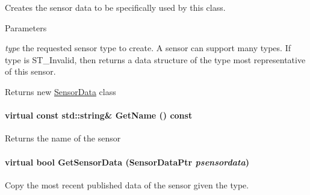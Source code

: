 Creates the sensor data to be specifically used by this class. 


\begin{DoxyParams}{Parameters}
\item[{\em type}]the requested sensor type to create. A sensor can support many types. If type is ST\_\-Invalid, then returns a data structure of the type most representative of this sensor. \end{DoxyParams}
\begin{DoxyReturn}{Returns}
new \hyperlink{classOpenRAVE_1_1SensorBase_1_1SensorData}{SensorData} class 
\end{DoxyReturn}
\hypertarget{classOpenRAVE_1_1SensorBase_a3cc720dbc55fa8e07a0f85343d3bb136}{
\paragraph[{GetName}]{\setlength{\rightskip}{0pt plus 5cm}virtual const std::string\& GetName () const}\hfill}
\label{classOpenRAVE_1_1SensorBase_a3cc720dbc55fa8e07a0f85343d3bb136}
\begin{DoxyReturn}{Returns}
the name of the sensor 
\end{DoxyReturn}
\hypertarget{classOpenRAVE_1_1SensorBase_ad7b2e5f8884dd4897de003828e8e8146}{
\paragraph[{GetSensorData}]{\setlength{\rightskip}{0pt plus 5cm}virtual bool GetSensorData (SensorDataPtr {\em psensordata})}\hfill}
\label{classOpenRAVE_1_1SensorBase_ad7b2e5f8884dd4897de003828e8e8146}


Copy the most recent published data of the sensor given the type. 

